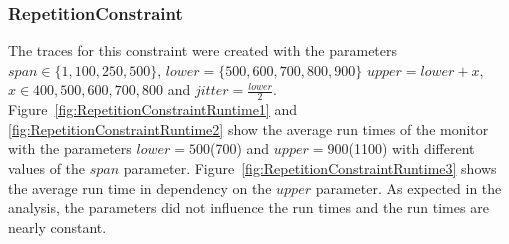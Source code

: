 \subsubsection{RepetitionConstraint}
	The traces for this constraint were created with the parameters $span\in\{1,100,250,500\}$, $lower=\{500,600,700,800,900\}$ $upper=lower+x$, $x\in{400,500,600,700,800}$ and $jitter=\frac{lower}{2}$.\\
	Figure~\ref{fig:RepetitionConstraintRuntime1} and \ref{fig:RepetitionConstraintRuntime2} show the average run times of the monitor with the parameters $lower=500$(700) and $upper=900$(1100) with different values of the $span$ parameter. Figure~\ref{fig:RepetitionConstraintRuntime3} shows the average run time in dependency on the $upper$ parameter. As expected in the analysis, the parameters did not influence the run times and the run times are nearly constant.
